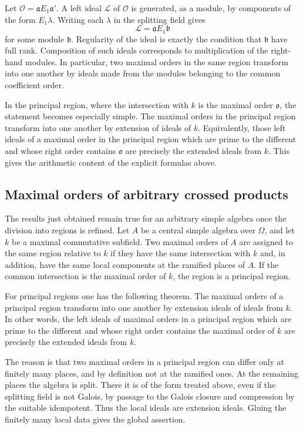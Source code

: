 \documentclass[12pt]{article}
\begin{document}
Let \(\mathcal O=\mathfrak aE_1\mathfrak a'\). A left ideal \(\mathcal L\) of \(\mathcal O\) is generated, as a module, by components of the form \(E_1\lambda\). Writing each \(\lambda\) in the splitting field gives
\[
  \mathcal L=\mathfrak aE_1\mathfrak b
\]
for some module \(\mathfrak b\). Regularity of the ideal is exactly the condition that \(\mathfrak b\) have full rank. Composition of such ideals corresponds to multiplication of the right-hand modules. In particular, two maximal orders in the same region transform into one another by ideals made from the modules belonging to the common coefficient order.

In the principal region, where the intersection with \(k\) is the maximal order \(\mathfrak o\), the statement becomes especially simple. The maximal orders in the principal region transform into one another by extension of ideals of \(k\). Equivalently, those left ideals of a maximal order in the principal region which are prime to the different and whose right order contains \(\mathfrak o\) are precisely the extended ideals from \(k\). This gives the arithmetic content of the explicit formulas above.

\subsection{Maximal orders of arbitrary crossed products}

The results just obtained remain true for an arbitrary simple algebra once the division into regions is refined. Let \(A\) be a central simple algebra over \(\Omega\), and let \(k\) be a maximal commutative subfield. Two maximal orders of \(A\) are assigned to the same region relative to \(k\) if they have the same intersection with \(k\) and, in addition, have the same local components at the ramified places of \(A\). If the common intersection is the maximal order of \(k\), the region is a principal region.

For principal regions one has the following theorem. The maximal orders of a principal region transform into one another by extension ideals of ideals from \(k\). In other words, the left ideals of maximal orders in a principal region which are prime to the different and whose right order contains the maximal order of \(k\) are precisely the extended ideals from \(k\).

The reason is that two maximal orders in a principal region can differ only at finitely many places, and by definition not at the ramified ones. At the remaining places the algebra is split. There it is of the form treated above, even if the splitting field is not Galois, by passage to the Galois closure and compression by the suitable idempotent. Thus the local ideals are extension ideals. Gluing the finitely many local data gives the global assertion.
\end{document}
